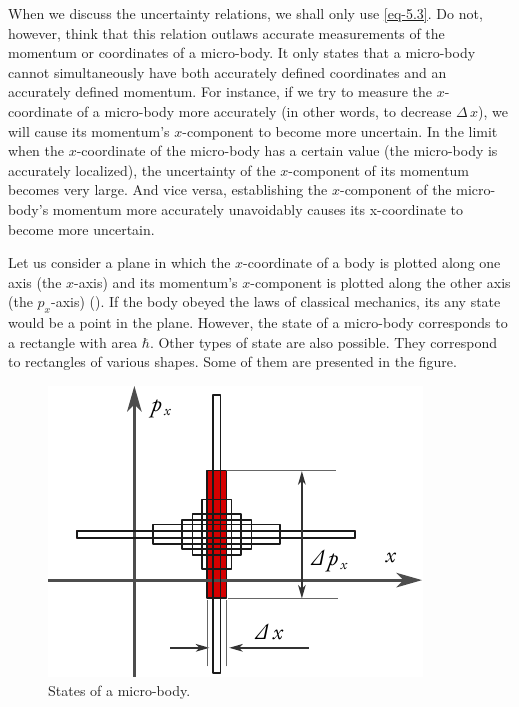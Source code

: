 When we discuss the uncertainty relations, we shall only use \eqref{eq-5.3}. Do not, however, think that this relation outlaws accurate measurements of the momentum or coordinates of a micro-body. It only states that a micro-body cannot simultaneously have both accurately defined coordinates and an accurately defined momentum. For instance, if we try to measure the $x$-coordinate of a micro-body more accurately (in other words, to decrease $\Delta \, x$), we will cause its momentum's $x$-component to become more uncertain. In the limit when the
$x$-coordinate of the micro-body has a certain value (the micro-body is
accurately localized), the uncertainty of the $x$-component of its
momentum becomes very large. And vice versa, establishing the
$x$-component of the micro-body's momentum more accurately
unavoidably causes its x-coordinate to become more uncertain.

Let us consider a plane in which the $x$-coordinate of a body is plotted
along one axis (the $x$-axis) and its momentum's $x$-component is plotted
along the other axis (the $p_{x}$-axis) (). If the body obeyed the laws of classical mechanics, its any state would be a point in the plane. However, the state of a micro-body corresponds to a rectangle with area $\hbar$. Other types of state are also possible. They correspond to rectangles of various shapes. Some of them are presented in the figure.

\begin{figure}
\centering
\includegraphics[width=1.\linewidth]{figures/unc.pdf}
\caption{ States of a micro-body.\label{unc}}
\end{figure}

